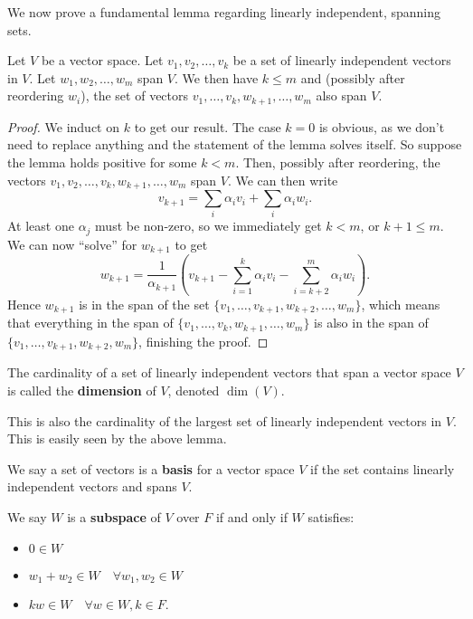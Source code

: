 We now prove a fundamental lemma regarding linearly independent,
spanning sets.
\begin{lem}
Let $V$ be a vector space. Let $v_1, v_2, \dots, v_k$ be a set of
linearly independent vectors in $V$. Let $w_1, w_2, \dots, w_m$ span
$V$. We then have $k \leq m$ and (possibly after reordering $w_i$), the
set of vectors $v_1, \dots, v_k, w_{k + 1}, \dots, w_m$ also span $V$.
\end{lem}

\begin{proof}
We induct on $k$ to get our result. The case $k = 0$ is obvious, as we
don't need to replace anything and the statement of the lemma solves
itself. So suppose the lemma holds positive for some $k < m$. Then,
possibly after reordering, the vectors $v_1, v_2, \dots, v_k, w_{k + 1},
\dots, w_m$ span $V$. We can then write
\[ v_{k + 1} = \sum_i \alpha_i v_i + \sum_i \alpha_i w_i. \]
At least one $\alpha_j$ must be non-zero, so we immediately get $k < m$,
or $k + 1 \leq m$. We can now ``solve'' for $w_{k + 1}$ to get
\[ w_{k + 1} = \frac{1}{\alpha_{k + 1}} \left(v_{k + 1} - \sum_{i =
1}^{k} \alpha_i v_i - \sum_{i = k + 2}^{m} \alpha_i w_i\right). \]
Hence $w_{k + 1}$ is in the span of the set $\lbrace v_1, \dots, v_{k +
1}, w_{k + 2}, \dots, w_m \rbrace$, which means that everything in the
span of $\lbrace v_1, \dots, v_k, w_{k + 1}, \dots, w_m \rbrace$ is also
in the span of $\lbrace v_1, \dots, v_{k + 1}, w_{k + 2}, w_m \rbrace$,
finishing the proof.
\end{proof}

\begin{df}
The cardinality of a set of linearly independent vectors that span a
vector space $V$ is called the \textbf{dimension} of $V$, denoted
$\dim(V)$.

This is also the cardinality of the largest set of linearly independent
vectors in $V$. This is easily seen by the above lemma.
\end{df}

\begin{df}
We say a set of vectors is a \textbf{basis} for a vector space $V$ if
the set contains linearly independent vectors and spans $V$.
\end{df}

\begin{df}
We say $W$ is a \textbf{subspace} of $V$ over $F$ if and only if $W$
satisfies:
\begin{itemize}
\item $0 \in W$
\item $w_1 + w_2 \in W \quad \forall w_1, w_2 \in W$
\item $k w \in W \quad \forall w \in W, k \in F$.
\end{itemize}
\end{df}

